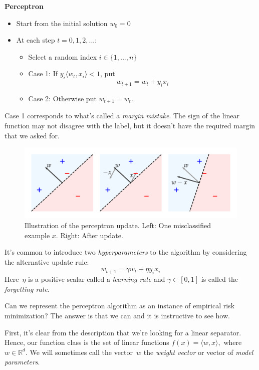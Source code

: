 \documentclass{tufte-book}
\begin{document}
\begin{Algorithm}

\textbf{Perceptron}

\begin{itemize}
\tightlist
\item
  Start from the initial solution \(w_0=0\)
\item
  At each step \(t=0,1,2,...\):

  \begin{itemize}
  \tightlist
  \item
    Select a random index \(i\in\{1,...,n\}\)
  \item
    Case 1: If \(y_i\langle w_t, x_i\rangle < 1\), put \[
    w_{t+1} = w_t + y_i x_i  
    \]
  \item
    Case 2: Otherwise put \(w_{t+1} = w_t\).
  \end{itemize}
\end{itemize}

\end{Algorithm}

Case 1 corresponds to what's called a \emph{margin mistake}. The sign of
the linear function may not disagree with the label, but it doesn't have
the required margin that we asked for.

\begin{figure}
\centering
\includegraphics{assets/perceptron}
\caption{Illustration of the perceptron update. Left: One misclassified
example \(x.\) Right: After update.}
\end{figure}

It's common to introduce two \emph{hyperparameters} to the algorithm by
considering the alternative update rule: \[
w_{t+1} = \gamma w_t + \eta y_i x_i
\] Here~\(\eta\) is a positive scalar called a \emph{learning rate} and
\(\gamma\in [0,1]\) is called the \emph{forgetting rate}.

Can we represent the perceptron algorithm as an instance of empirical
risk minimization? The answer is that we can and it is instructive to
see how.

First, it's clear from the description that we're looking for a linear
separator. Hence, our function class is the set of linear functions
\(f(x)=\langle w, x\rangle,\) where~\(w\in\mathbb{R}^d\). We will
sometimes call the vector~\(w\) the \emph{weight vector} or vector of
\emph{model parameters}.
\end{document}

